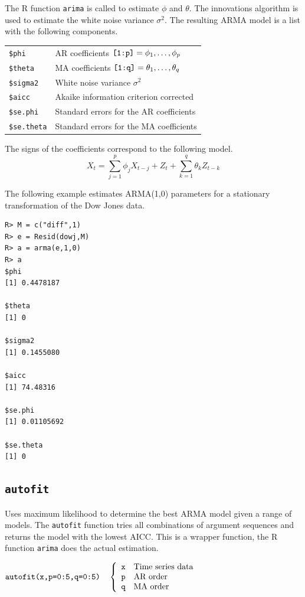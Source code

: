 \documentclass[11pt]{article}
\begin{document}
\bigskip
\noindent
The R function {\tt arima} is called to
estimate $\phi$ and $\theta$.
The innovations algorithm is used to estimate the white noise
variance $\sigma^2$.
The resulting ARMA model is a list with the following components.

\begin{center}
\begin{tabular}{ll}
{\tt \$phi} & AR coefficients $\hbox{\tt[1:p]}=\phi_1,\ldots,\phi_p$\\
{\tt \$theta} & MA coefficients $\hbox{\tt[1:q]}=\theta_1,\ldots,\theta_q$\\
{\tt \$sigma2} & White noise variance $\sigma^2$\\
{\tt \$aicc} & Akaike information criterion corrected\\
{\tt \$se.phi} & Standard errors for the AR coefficients\\
{\tt \$se.theta} & Standard errors for the MA coefficients
\end{tabular}
\end{center}

\noindent
The signs of the coefficients correspond to the following model.
\[
X_t=\sum_{j=1}^p\phi_jX_{t-j}+Z_t+\sum_{k=1}^q\theta_kZ_{t-k}
\]

\noindent
The following example estimates ARMA(1,0) parameters
for a stationary transformation of the Dow Jones data.

\begin{verbatim}
R> M = c("diff",1)
R> e = Resid(dowj,M)
R> a = arma(e,1,0)
R> a
$phi
[1] 0.4478187

$theta
[1] 0

$sigma2
[1] 0.1455080

$aicc
[1] 74.48316

$se.phi
[1] 0.01105692

$se.theta
[1] 0
\end{verbatim}

\newpage

\subsection{\tt autofit}
Uses maximum likelihood to determine the best ARMA model given a range of models.
The {\tt autofit} function tries all combinations of argument sequences and returns the model
with the lowest AICC.
This is a wrapper function,
the R function {\tt arima} does
the actual estimation.

\bigskip
$
\hbox{\tt autofit(x,p=0:5,q=0:5)}\quad\left\{\begin{array}{ll}
{\tt x} & \hbox{Time series data}\\
{\tt p} & \hbox{AR order}\\
{\tt q} & \hbox{MA order}
\end{array}\right.
$
\end{document}
